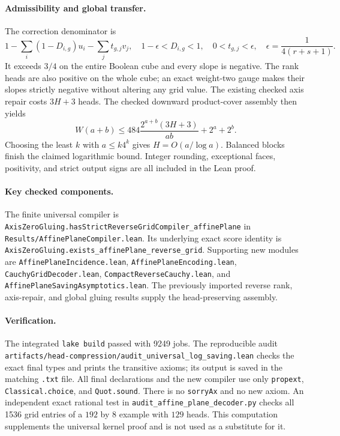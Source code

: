 \documentclass[11pt]{article}
\begin{document}
\paragraph{Admissibility and global transfer.}
The correction denominator is
\[
 1-\sum_i(1-D_{i,g})u_i-\sum_jt_{g,j}v_j,
 \quad 1-\epsilon<D_{i,g}<1,\quad 0<t_{g,j}<\epsilon,
 \quad \epsilon=\frac1{4(r+s+1)}.
\]
It exceeds $3/4$ on the entire Boolean cube and every slope is negative.
The rank heads are also positive on the whole cube; an exact weight-two
gauge makes their slopes strictly negative without altering any grid value.
The existing checked axis repair costs $3H+3$ heads. The checked downward
product-cover assembly then yields
\[
 W(a+b)\le484\frac{2^{a+b}(3H+3)}{ab}+2^a+2^b.
\]
Choosing the least $k$ with $a\le k4^k$ gives $H=O(a/\log a)$.
Balanced blocks finish the claimed logarithmic bound. Integer rounding,
exceptional faces, positivity, and strict output signs are all included in
the Lean proof.

\paragraph{Key checked components.}
The finite universal compiler is
\texttt{AxisZeroGluing.hasStrictReverseGridCompiler\_affinePlane} in
\texttt{Results/AffinePlaneCompiler.lean}. Its underlying exact score identity
is \texttt{AxisZeroGluing.exists\_affinePlane\_reverse\_grid}.
Supporting new modules are \texttt{AffinePlaneIncidence.lean},
\texttt{AffinePlaneEncoding.lean}, \texttt{CauchyGridDecoder.lean},
\texttt{CompactReverseCauchy.lean}, and
\texttt{AffinePlaneSavingAsymptotics.lean}.
The previously imported reverse rank, axis-repair, and global gluing
results supply the head-preserving assembly.

\paragraph{Verification.}
The integrated \texttt{lake build} passed with 9249 jobs.
The reproducible audit
\texttt{artifacts/head-compression/audit\_universal\_log\_saving.lean}
checks the exact final types and prints the transitive axioms;
its output is saved in the matching \texttt{.txt} file.
All final declarations and the new compiler use only \texttt{propext},
\texttt{Classical.choice}, and \texttt{Quot.sound}.
There is no \texttt{sorryAx} and no new axiom.
An independent exact rational test in
\texttt{audit\_affine\_plane\_decoder.py} checks all 1536 grid entries
of a $192$ by $8$ example with $129$ heads. This computation supplements
the universal kernel proof and is not used as a substitute for it.
\end{document}
